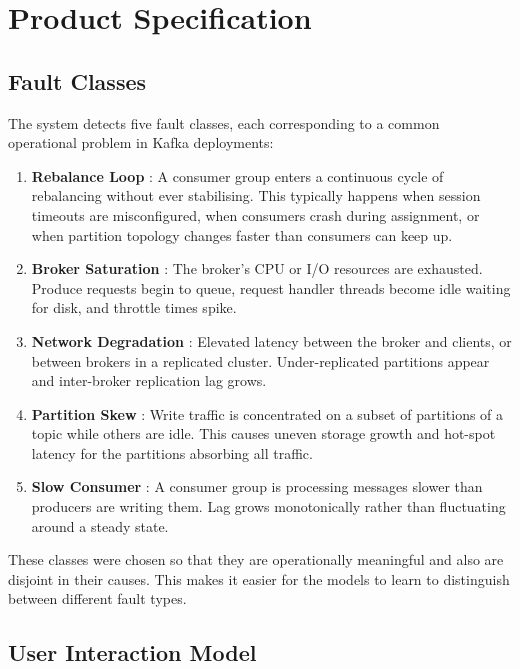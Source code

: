 \documentclass[12pt, a4paper]{article}
\begin{document}
\section{Product Specification}

\subsection{Fault Classes}

The system detects five fault classes, each corresponding to a common operational
problem in Kafka deployments:

\begin{enumerate}[leftmargin=*, label=\textbf{Class \arabic*.}]
    \item \textbf{Rebalance Loop} : A consumer group enters a continuous cycle
          of rebalancing without ever stabilising. This typically happens when
          session timeouts are misconfigured, when consumers crash during
          assignment, or when partition topology changes faster than consumers
          can keep up.
    \item \textbf{Broker Saturation} : The broker's CPU or I/O resources are
          exhausted. Produce requests begin to queue, request handler threads
          become idle waiting for disk, and throttle times spike.
    \item \textbf{Network Degradation} : Elevated latency between the broker
          and clients, or between brokers in a replicated cluster. Under-replicated
          partitions appear and inter-broker replication lag grows.
    \item \textbf{Partition Skew} : Write traffic is concentrated on a subset
          of partitions of a topic while others are idle. This causes uneven
          storage growth and hot-spot latency for the partitions absorbing all
          traffic.
    \item \textbf{Slow Consumer} : A consumer group is processing messages
          slower than producers are writing them. Lag grows monotonically rather
          than fluctuating around a steady state.
\end{enumerate}

These classes were chosen so that they are operationally meaningful and also are disjoint in their causes. 
This makes it easier for the models to learn to distinguish between different fault types.

\subsection{User Interaction Model}
\end{document}
